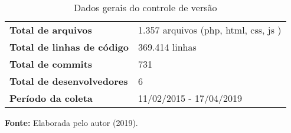 \begin{table}
\caption{Dados gerais do controle de versão}
\label{quadro_git_ingresso}
\centering
\begin{tabular}{ l l }
   \cline{1-1}\cline{2-2}  
    \multicolumn{1}{|p{5.850cm}|}{\textbf{Total de arquivos}} &
    \multicolumn{1}{p{8.217cm}|}{1.357 arquivos (php, html, css, js )}
  \\ 
   \cline{1-1}\cline{2-2}  
    \multicolumn{1}{|p{5.850cm}|}{\textbf{Total de linhas de código}} &
    \multicolumn{1}{p{8.217cm}|}{369.414 linhas}
  \\    
   \cline{1-1}\cline{2-2}  
    \multicolumn{1}{|p{5.850cm}|}{\textbf{Total de commits}} &
    \multicolumn{1}{p{8.217cm}|}{731}
  \\    
   \cline{1-1}\cline{2-2}  
    \multicolumn{1}{|p{5.850cm}|}{\textbf{Total de desenvolvedores}} &
    \multicolumn{1}{p{8.217cm}|}{6}
  \\     
   \cline{1-1}\cline{2-2}  
    \multicolumn{1}{|p{5.850cm}|}{\textbf{Período da coleta}} &
    \multicolumn{1}{p{8.217cm}|}{11/02/2015 - 17/04/2019}
  \\       
  \hline

 \end{tabular} 
 \par\medskip\textbf{Fonte:} Elaborada pelo autor (2019). \par\medskip
\end{table}